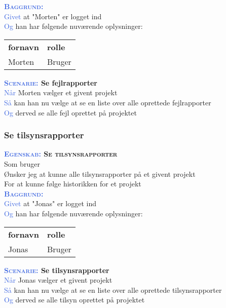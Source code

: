 \textsc{\textcolor{RoyalBlue}{\textbf{Baggrund:}}}\\
\textcolor{RoyalBlue}{Givet} at "Morten" er logget ind\\
\textcolor{RoyalBlue}{Og} han har følgende nuværende oplysninger:\\
\begin{tabular}{| l | l |}
	\textbf{fornavn} & \textbf{rolle} \\
	Morten & Bruger\\
\end{tabular}
\newline \newline

\textbf{\textsc{\textcolor{RoyalBlue}{Scenarie:}} Se fejlrapporter}\\
\textcolor{RoyalBlue}{Når} Morten vælger et givent projekt\\
\textcolor{RoyalBlue}{Så} kan han nu vælge at se en liste over alle oprettede fejlrapporter\\
\textcolor{RoyalBlue}{Og} derved se alle fejl oprettet på projektet\\

\subsubsection{Se tilsynsrapporter} %
\textbf{\textsc{\textcolor{RoyalBlue}{Egenskab:} Se tilsynsrapporter}}\\
Som bruger\\
Ønsker jeg at kunne alle tilsynsrapporter på et givent projekt\\
For at kunne følge historikken for et projekt\\

\textsc{\textcolor{RoyalBlue}{\textbf{Baggrund:}}}\\
\textcolor{RoyalBlue}{Givet} at "Jonas" er logget ind\\
\textcolor{RoyalBlue}{Og} han har følgende nuværende oplysninger:\\
\begin{tabular}{| l | l |}
	\textbf{fornavn} & \textbf{rolle} \\
	Jonas & Bruger\\
\end{tabular}
\newline \newline

\textbf{\textsc{\textcolor{RoyalBlue}{Scenarie:}} Se tilsynsrapporter}\\
\textcolor{RoyalBlue}{Når} Jonas vælger et givent projekt\\
\textcolor{RoyalBlue}{Så} kan han nu vælge at se en liste over alle oprettede tilsynsrapporter\\
\textcolor{RoyalBlue}{Og} derved se alle tilsyn oprettet på projektet\\

